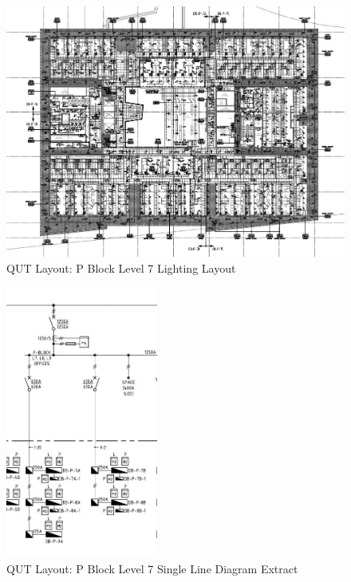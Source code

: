\begin{figure}[H]
	\hfill\includegraphics[width = 120mm]{images/project-model/qut-lvl7-lighting}\hspace*{\fill}
	\caption{QUT Layout: P Block Level 7 Lighting Layout} 
	\label{fig:project-model-pblock-lvl7}
\end{figure}

\begin{figure}[H]
	\hfill\includegraphics[width = 50mm]{images/project-model/qut-lvl7-sld-extract}\hspace*{\fill}
	\caption{QUT Layout: P Block Level 7 Single Line Diagram Extract} 
	\label{fig:project-model-pblock-lvl7-sld-extract}
\end{figure}

